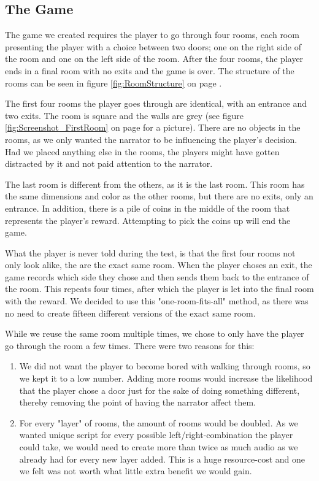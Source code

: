 \subsection{The Game}
\label{Method_Game}

The game we created requires the player to go through four rooms, each room presenting the player with a choice between two doors; one on the right side of the room and one on the left side of the room. After the four rooms, the player ends in a final room with no exits and the game is over. The structure of the rooms can be seen in figure \ref{fig:RoomStructure} on page \pageref{fig:RoomStructure}.


The first four rooms the player goes through are identical, with an entrance and two exits. The room is square and the walls are grey (see figure \ref{fig:Screenshot_FirstRoom} on page \pageref{fig:Screenshot_FirstRoom} for a picture). There are no objects in the rooms, as we only wanted the narrator to be influencing the player's decision. Had we placed anything else in the rooms, the players might have gotten distracted by it and not paid attention to the narrator.


The last room is different from the others, as it is the last room. This room has the same dimensions and color as the other rooms, but there are no exits, only an entrance. In addition, there is a pile of coins in the middle of the room that represents the player's reward. Attempting to pick the coins up will end the game.

What the player is never told during the test, is that the first four rooms not only look alike, the are the exact same room. When the player choses an exit, the game records which side they chose and then sends them back to the entrance of the room. This repeats four times, after which the player is let into the final room with the reward. We decided to use this "one-room-fits-all" method, as there was no need to create fifteen different versions of the exact same room.

While we reuse the same room multiple times, we chose to only have the player go through the room a few times. There were two reasons for this:
\begin{enumerate}
	\item We did not want the player to become bored with walking through rooms, so we kept it to a low number. Adding more rooms would increase the likelihood that the player chose a door just for the sake of doing something different, thereby removing the point of having the narrator affect them.
	\item For every "layer" of rooms, the amount of rooms would be doubled. As we wanted unique script for every possible left/right-combination the player could take, we would need to create more than twice as much audio as we already had for every new layer added. This is a huge resource-cost and one we felt was not worth what little extra benefit we would gain.
\end{enumerate}

